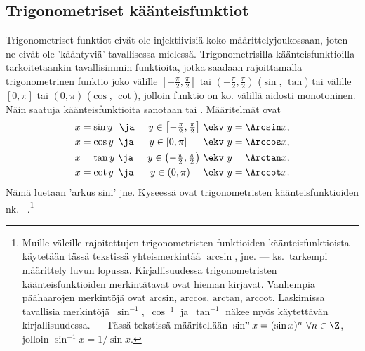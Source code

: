 \subsection*{Trigonometriset käänteisfunktiot}

Trigonometriset funktiot eivät ole injektiivisiä koko määrittelyjoukossaan, joten ne eivät ole 
'kääntyviä' tavallisessa mielessä. Trigonometrisilla käänteisfunktioilla tarkoitetaankin 
tavallisimmin funktioita, jotka saadaan rajoittamalla trigonometrinen funktio joko välille 
$[-\frac{\pi}{2},\frac{\pi}{2}]$ tai $(-\frac{\pi}{2},\frac{\pi}{2})$ ($\sin$, $\tan$) tai 
välille $[0,\pi]$ tai $(0,\pi)$ ($\cos$, $\cot$), jolloin funktio on ko. välillä aidosti 
monotoninen. Näin saatuja käänteisfunktioita sanotaan
 tai . Määritelmät ovat
\begin{alignat*}{2}
x&=\sin y\ \ \ja \ &y \in \left[-\tfrac{\pi}{2},\tfrac{\pi}{2}\right] \ & \ekv\ y=\Arcsin x, \\
x&=\cos y\,\ \ja \ &y \in \left[0,\pi\right]\quad\ \ & \ekv \ y=\Arccos x, \\
x&=\tan y \ \ja \ &y \in \left(-\tfrac{\pi}{2},\tfrac{\pi}{2}\right) \ & \ekv\ y=\Arctan x, \\
x&=\cot y\,\ \ja \ &y \in \left(0,\pi\right)\quad\ & \ekv \ y=\Arccot x.
\end{alignat*}
Nämä luetaan 'arkus sini' jne. Kyseessä ovat trigonometristen käänteisfunktioiden nk.\
%
.\footnote[2]{ Muille väleille rajoitettujen trigonometristen funktioiden 
käänteisfunktioista käytetään tässä tekstissä yhteismerkintää $\arcsin$, jne. --- ks.\ tarkempi
määrittely luvun lopussa. Kirjallisuudessa trigonometristen käänteisfunktioiden merkintätavat
ovat hieman kirjavat. Vanhempia päähaarojen merkintöjä ovat $\overline{\text{arc}}$sin, 
$\overline{\text{arc}}$cos, $\overline{\text{arc}}$tan, $\overline{\text{arc}}$cot. Laskimissa
tavallisia merkintöjä $\,\sin^{-1}$, $\,\cos^{-1}$ ja $\,\tan^{-1}$ näkee myös käytettävän 
kirjallisuudessa. --- Tässä tekstissä määritellään $\,\sin^n x=(\sin x)^n\ \forall n\in\Z$,
jolloin $\sin^{-1}x=1/\sin x$.}

